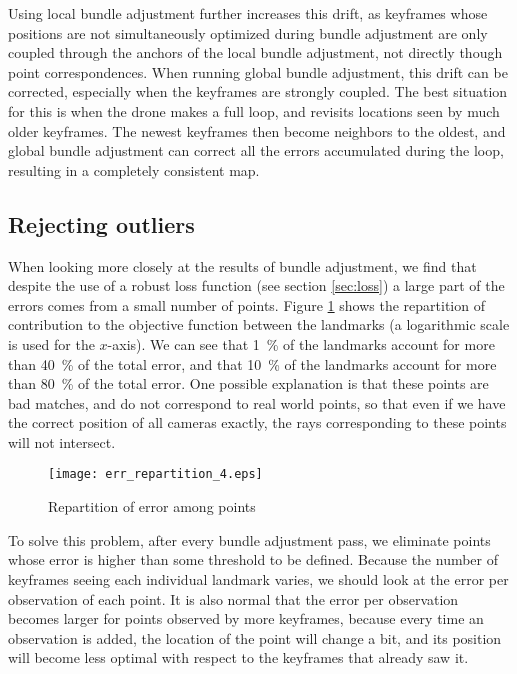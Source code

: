 Using local bundle adjustment further increases this drift, as keyframes whose positions are not simultaneously optimized during bundle adjustment are only coupled through the anchors of the local bundle adjustment, not directly though point correspondences. When running global bundle adjustment, this drift can be corrected, especially when the keyframes are strongly coupled. The best situation for this is when the drone makes a full loop, and revisits locations seen by much older keyframes. The newest keyframes then become neighbors to the oldest, and global bundle adjustment can correct all the errors accumulated during the loop, resulting in a completely consistent map.

\subsection{Rejecting outliers}
When looking more closely at the results of bundle adjustment, we find that despite the use of a robust loss function (see section \ref{sec:loss}) a large part of the errors comes from a small number of points. Figure \ref{fig:errorrepartition} shows the repartition of contribution to the objective function between the landmarks (a logarithmic scale is used for the $x$-axis). We can see that \SI{1}{\percent} of the landmarks account for more than \SI{40}{\percent} of the total error, and that \SI{10}{\percent} of the landmarks account for more than \SI{80}{\percent} of the total error.  One possible explanation is that these points are bad matches, and do not correspond to real world points, so that even if we have the correct position of all cameras exactly, the rays corresponding to these points will not intersect.

\begin{figure}[H]
  \centering
  \texttt{[image: err\_repartition\_4.eps]}
  \caption{Repartition of error among points}
  \label{fig:errorrepartition}
\end{figure}

To solve this problem, after every bundle adjustment pass, we eliminate points whose error is higher than some threshold to be defined. Because the number of keyframes seeing each individual landmark varies, we should look at the error per observation of each point. It is also normal that the error per observation becomes larger for points observed by more keyframes, because every time an observation is added, the location of the point will change a bit, and its position will become less optimal with respect to the keyframes that already saw it.\\

